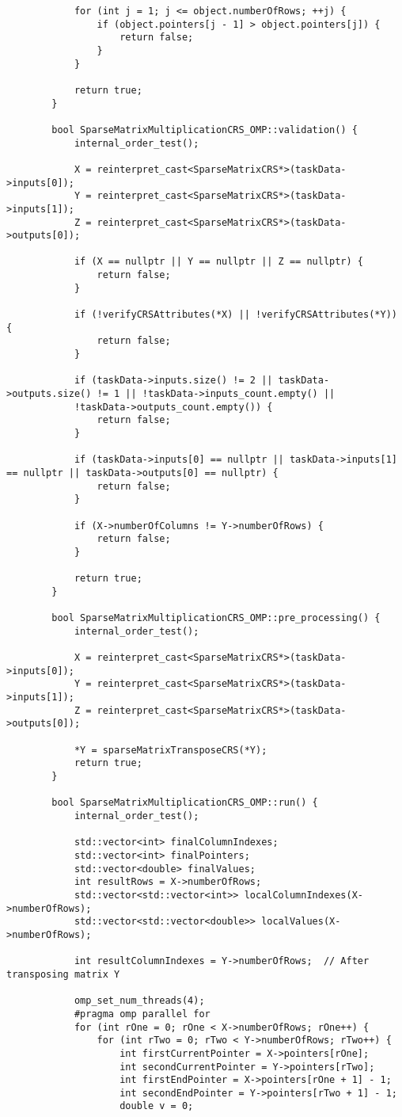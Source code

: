 \documentclass[a4paper, 14pt]{article}
\begin{document}
\begin{verbatim}
			for (int j = 1; j <= object.numberOfRows; ++j) {
				if (object.pointers[j - 1] > object.pointers[j]) {
					return false;
				}
			}
			
			return true;
		}
		
		bool SparseMatrixMultiplicationCRS_OMP::validation() {
			internal_order_test();
			
			X = reinterpret_cast<SparseMatrixCRS*>(taskData->inputs[0]);
			Y = reinterpret_cast<SparseMatrixCRS*>(taskData->inputs[1]);
			Z = reinterpret_cast<SparseMatrixCRS*>(taskData->outputs[0]);
			
			if (X == nullptr || Y == nullptr || Z == nullptr) {
				return false;
			}
			
			if (!verifyCRSAttributes(*X) || !verifyCRSAttributes(*Y)) {
				return false;
			}
			
			if (taskData->inputs.size() != 2 || taskData->outputs.size() != 1 || !taskData->inputs_count.empty() ||
			!taskData->outputs_count.empty()) {
				return false;
			}
			
			if (taskData->inputs[0] == nullptr || taskData->inputs[1] == nullptr || taskData->outputs[0] == nullptr) {
				return false;
			}
			
			if (X->numberOfColumns != Y->numberOfRows) {
				return false;
			}
			
			return true;
		}
		
		bool SparseMatrixMultiplicationCRS_OMP::pre_processing() {
			internal_order_test();
			
			X = reinterpret_cast<SparseMatrixCRS*>(taskData->inputs[0]);
			Y = reinterpret_cast<SparseMatrixCRS*>(taskData->inputs[1]);
			Z = reinterpret_cast<SparseMatrixCRS*>(taskData->outputs[0]);
			
			*Y = sparseMatrixTransposeCRS(*Y);
			return true;
		}
		
		bool SparseMatrixMultiplicationCRS_OMP::run() {
			internal_order_test();
			
			std::vector<int> finalColumnIndexes;
			std::vector<int> finalPointers;
			std::vector<double> finalValues;
			int resultRows = X->numberOfRows;
			std::vector<std::vector<int>> localColumnIndexes(X->numberOfRows);
			std::vector<std::vector<double>> localValues(X->numberOfRows);
			
			int resultColumnIndexes = Y->numberOfRows;  // After transposing matrix Y
			
			omp_set_num_threads(4);
			#pragma omp parallel for
			for (int rOne = 0; rOne < X->numberOfRows; rOne++) {
				for (int rTwo = 0; rTwo < Y->numberOfRows; rTwo++) {
					int firstCurrentPointer = X->pointers[rOne];
					int secondCurrentPointer = Y->pointers[rTwo];
					int firstEndPointer = X->pointers[rOne + 1] - 1;
					int secondEndPointer = Y->pointers[rTwo + 1] - 1;
					double v = 0;
					

\end{verbatim}
\end{document}
